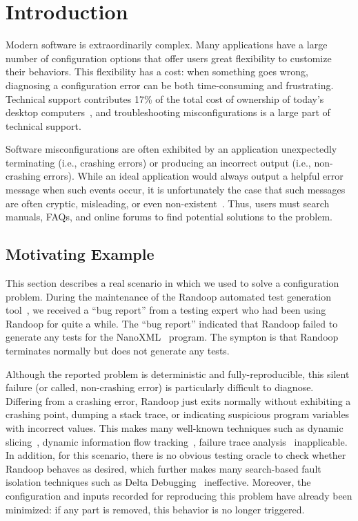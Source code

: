 
\section{Introduction}
\label{sec:introduction}

Modern software is extraordinarily complex. Many applications have a large
number of configuration options that offer users great flexibility to
customize their behaviors. This flexibility has a cost: when something
goes wrong, diagnosing a configuration error can be both time-consuming
and frustrating. Technical support contributes 17\% of the total cost of ownership of
today's desktop computers~\cite{confevidence}, and troubleshooting misconfigurations
is a large part of technical support.

Software misconfigurations are often exhibited by an application unexpectedly terminating
(i.e., crashing errors) or producing an incorrect output (i.e., non-crashing errors). While an ideal application would always
output a helpful error message when such events occur, it is unfortunately
the case that such messages are often cryptic, misleading, or
even non-existent~\cite{Yin:2011:ESC, Attariyan:2010:ACT, Hubaux:2012, rangefix}.
Thus, users must search manuals, FAQs, and online forums to find potential
solutions to the problem. %

\subsection{Motivating Example}
\label{sec:mot}

This section describes a real scenario in which we used \ourtool to solve
a configuration problem. During the maintenance of the Randoop
automated test generation tool~\cite{randoop}, we received a ``bug report''
from a testing expert who had been using Randoop for quite a while.
The ``bug report'' indicated that Randoop failed to generate
any tests for the NanoXML~\cite{nanoxml} program. The sympton is that
Randoop terminates normally but does not generate any tests.

Although the reported problem is deterministic and fully-reproducible,
this silent failure (or called, non-crashing error) is
particularly difficult to diagnose. Differing from
a crashing error, Randoop just exits normally without exhibiting
a crashing point, dumping a stack trace, or indicating suspicious program variables
with incorrect values. This makes many well-known
techniques such as dynamic slicing~\cite{Zhang:2003:PDS},
dynamic information flow tracking~\cite{Attariyan:2010:ACT},
failure trace analysis~\cite{Rabkin:2011:PPC} inapplicable.
In addition, for this scenario, there is no obvious testing oracle to check whether
Randoop behaves as desired, which further makes many
search-based fault isolation techniques such as Delta Debugging~\cite{Zeller:2002:ICC}
ineffective. Moreover, the configuration and
inputs recorded for reproducing this problem have already been
minimized: if any part is removed, this behavior
is no longer triggered. 

